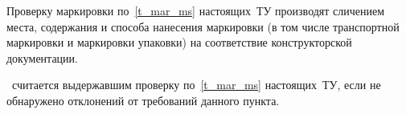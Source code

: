 Проверку маркировки по~\ref{t_mar_ms} настоящих~ТУ  производят сличением места, содержания и способа нанесения маркировки (в том числе транспортной маркировки и маркировки упаковки) на соответствие конструкторской документации.
	
\dut \ считается выдержавшим проверку по~\ref{t_mar_ms} настоящих~ТУ, если не обнаружено отклонений от требований данного пункта.